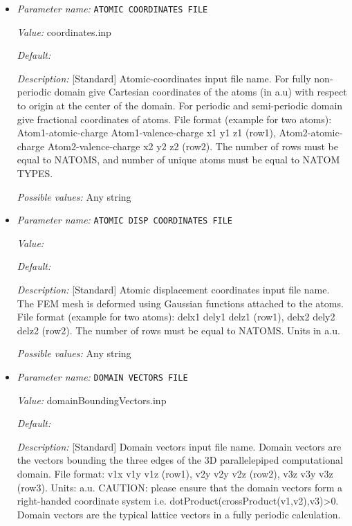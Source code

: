 \begin{itemize}
\item {\it Parameter name:} {\tt ATOMIC COORDINATES FILE}
\label{parameters:Geometry/ATOMIC COORDINATES FILE}
\label{parameters:Geometry/ATOMIC_20COORDINATES_20FILE}


{\it Value:} coordinates.inp


{\it Default:} 


{\it Description:} [Standard] Atomic-coordinates input file name. For fully non-periodic domain give Cartesian coordinates of the atoms (in a.u) with respect to origin at the center of the domain. For periodic and semi-periodic domain give fractional coordinates of atoms. File format (example for two atoms): Atom1-atomic-charge Atom1-valence-charge x1 y1 z1 (row1), Atom2-atomic-charge Atom2-valence-charge x2 y2 z2 (row2). The number of rows must be equal to NATOMS, and number of unique atoms must be equal to NATOM TYPES.


{\it Possible values:} Any string
\item {\it Parameter name:} {\tt ATOMIC DISP COORDINATES FILE}
\label{parameters:Geometry/ATOMIC DISP COORDINATES FILE}
\label{parameters:Geometry/ATOMIC_20DISP_20COORDINATES_20FILE}


{\it Value:} 


{\it Default:} 


{\it Description:} [Standard] Atomic displacement coordinates input file name. The FEM mesh is deformed using Gaussian functions attached to the atoms. File format (example for two atoms): delx1 dely1 delz1 (row1), delx2 dely2 delz2 (row2). The number of rows must be equal to NATOMS. Units in a.u.


{\it Possible values:} Any string
\item {\it Parameter name:} {\tt DOMAIN VECTORS FILE}
\label{parameters:Geometry/DOMAIN VECTORS FILE}
\label{parameters:Geometry/DOMAIN_20VECTORS_20FILE}


{\it Value:} domainBoundingVectors.inp


{\it Default:} 


{\it Description:} [Standard] Domain vectors input file name. Domain vectors are the vectors bounding the three edges of the 3D parallelepiped computational domain. File format: v1x v1y v1z (row1), v2y v2y v2z (row2), v3z v3y v3z (row3). Units: a.u. CAUTION: please ensure that the domain vectors form a right-handed coordinate system i.e. dotProduct(crossProduct(v1,v2),v3)>0. Domain vectors are the typical lattice vectors in a fully periodic calculation.



\end{itemize}
